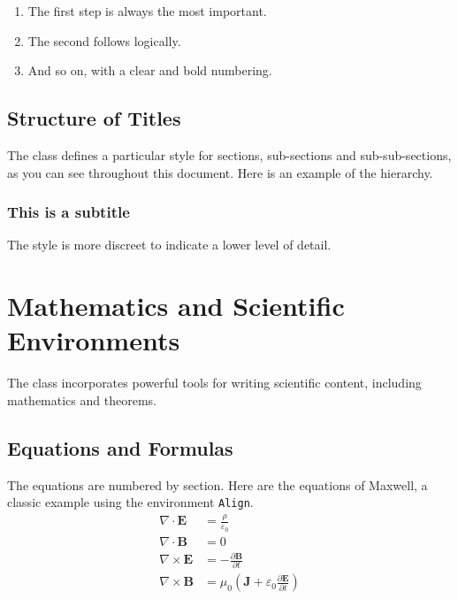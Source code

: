 \documentclass{mytex}
\begin{document}
\begin{enumerate}
	\item The first step is always the most important.
	\item The second follows logically.
	\item And so on, with a clear and bold numbering.
\end{enumerate}

\subsection{Structure of Titles}
The class defines a particular style for sections, sub-sections and sub-sub-sections, as you can see throughout this document. Here is an example of the hierarchy.

\subsubsection{This is a subtitle}
The style is more discreet to indicate a lower level of detail.


\section{Mathematics and Scientific Environments}
The class incorporates powerful tools for writing scientific content, including mathematics and theorems.

\subsection{Equations and Formulas}

The equations are numbered by section. Here are the equations of Maxwell, a classic example using the environment \texttt{Align}.
\begin{align}
	\nabla \cdot \mathbf{E} &= \frac{\rho}{\varepsilon_0} \label{eq:maxwell1} \\
	\nabla \cdot \mathbf{B} &= 0 \label{eq:maxwell2} \\
	\nabla \times \mathbf{E} &= -\frac{\partial \mathbf{B}}{\partial t} \label{eq:maxwell3} \\
	\nabla \times \mathbf{B} &= \mu_0 \left( \mathbf{J} + \varepsilon_0 \frac{\partial \mathbf{E}}{\partial t} \right) \label{eq:maxwell4}
\end{align}
\end{document}
